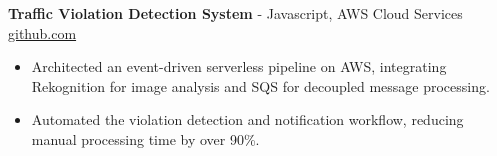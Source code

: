 \documentclass[11pt]{article}       %
\begin{document}

\textbf{Traffic Violation Detection System}{ - Javascript, AWS Cloud Services} \hfill \href{https://github.com/Monica20030707/AWS_rekonigition-N-read-database}{github.com} \\
\vspace{-9pt}
\begin{itemize}
  \item Architected an event-driven serverless pipeline on AWS, integrating Rekognition for image analysis and SQS for decoupled message processing.
  \item Automated the violation detection and notification workflow, reducing manual processing time by over 90\%.
\end{itemize}

\end{document}
